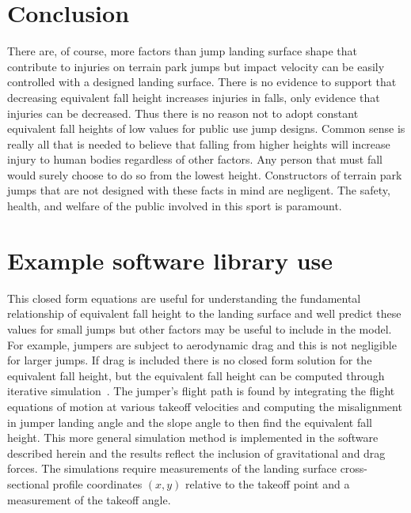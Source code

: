 \documentclass{article}
\begin{document}
\section{Conclusion}
%
There are, of course, more factors than jump landing surface shape that
contribute to injuries on terrain park jumps but impact velocity can be easily
controlled with a designed landing surface. There is no evidence to support
that decreasing equivalent fall height increases injuries in falls, only
evidence that injuries can be decreased. Thus there is no reason not to adopt
constant equivalent fall heights of low values for public use jump designs.
Common sense is really all that is needed to believe that falling from higher
heights will increase injury to human bodies regardless of other factors. Any
person that must fall would surely choose to do so from the lowest height.
Constructors of terrain park jumps that are not designed with these facts in
mind are negligent. The safety, health, and welfare of the public involved in
this sport is paramount.





\appendix

\section{Example software library use}
%
This closed form equations are useful for understanding the fundamental
relationship of equivalent fall height to the landing surface and well predict
these values for small jumps but other factors may be useful to include in the
model. For example, jumpers are subject to aerodynamic drag and this is not
negligible for larger jumps. If drag is included there is no closed form
solution for the equivalent fall height, but the equivalent fall height can be
computed through iterative simulation~\cite{Levy2015}. The jumper's flight path
is found by integrating the flight equations of motion at various takeoff
velocities and computing the misalignment in jumper landing angle and the slope
angle to then find the equivalent fall height. This more general simulation
method is implemented in the software described herein and the results reflect
the inclusion of gravitational and drag forces. The simulations require
measurements of the landing surface cross-sectional profile coordinates $(x,y)$
relative to the takeoff point and a measurement of the takeoff angle.
\end{document}
